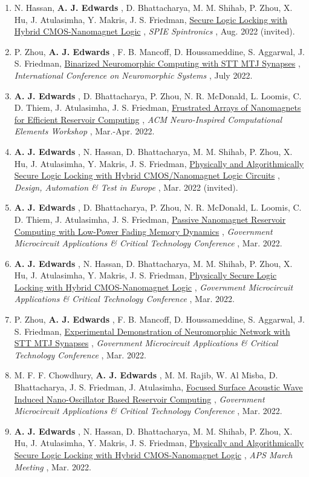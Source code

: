 \documentclass[12pt]{article}
\begin{document}
\begin{enumerate}
\item N. Hassan, \textbf{A. J. Edwards} , D. Bhattacharya, M. M. Shihab, P. Zhou, X. Hu, J. Atulasimha, Y. Makris, J. S. Friedman, \ul{Secure Logic Locking with Hybrid CMOS-Nanomagnet Logic} , \textit{SPIE Spintronics} , Aug. 2022 (invited).
\item P. Zhou, \textbf{A. J. Edwards} , F. B. Mancoff, D. Houssameddine, S. Aggarwal, J. S. Friedman, \ul{Binarized Neuromorphic Computing with STT MTJ Synapses} , \textit{International Conference on Neuromorphic Systems} , July 2022.
\item \textbf{A. J. Edwards} , D. Bhattacharya, P. Zhou, N. R. McDonald, L. Loomis, C. D. Thiem, J. Atulasimha, J. S. Friedman, \ul{Frustrated Arrays of Nanomagnets for Efficient Reservoir Computing} , \textit{ACM Neuro-Inspired Computational Elements Workshop} , Mar.-Apr. 2022.
\item \textbf{A. J. Edwards} , N. Hassan, D. Bhattacharya, M. M. Shihab, P. Zhou, X. Hu, J. Atulasimha, Y. Makris, J. S. Friedman, \href{Papers/EdwardsNMLDATE2022.pdf}{Physically and Algorithmically Secure Logic Locking with Hybrid CMOS/Nanomagnet Logic Circuits} , \textit{Design, Automation \& Test in Europe} , Mar. 2022 (invited).
\item \textbf{A. J. Edwards} , D. Bhattacharya, P. Zhou, N. R. McDonald, L. Loomis, C. D. Thiem, J. Atulasimha, J. S. Friedman, \ul{Passive Nanomagnet Reservoir Computing with Low-Power Fading Memory Dynamics} , \textit{Government Microcircuit Applications \& Critical Technology Conference} , Mar. 2022.
\item \textbf{A. J. Edwards} , N. Hassan, D. Bhattacharya, M. M. Shihab, P. Zhou, X. Hu, J. Atulasimha, Y. Makris, J. S. Friedman, \ul{Physically Secure Logic Locking with Hybrid CMOS-Nanomagnet Logic} , \textit{Government Microcircuit Applications \& Critical Technology Conference} , Mar. 2022.
\item P. Zhou, \textbf{A. J. Edwards} , F. B. Mancoff, D. Houssameddine, S. Aggarwal, J. S. Friedman, \ul{Experimental Demonstration of Neuromorphic Network with STT MTJ Synapses} , \textit{Government Microcircuit Applications \& Critical Technology Conference} , Mar. 2022.
\item M. F. F. Chowdhury, \textbf{A. J. Edwards} , M. M. Rajib, W. Al Misba, D. Bhattacharya, J. S. Friedman, J. Atulasimha, \ul{Focused Surface Acoustic Wave Induced Nano-Oscillator Based Reservoir Computing} , \textit{Government Microcircuit Applications \& Critical Technology Conference} , Mar. 2022.
\item \textbf{A. J. Edwards} , N. Hassan, D. Bhattacharya, M. M. Shihab, P. Zhou, X. Hu, J. Atulasimha, Y. Makris, J. S. Friedman, \ul{Physically and Algorithmically Secure Logic Locking with Hybrid CMOS-Nanomagnet Logic} , \textit{APS March Meeting} , Mar. 2022.

\end{enumerate}
\end{document}
